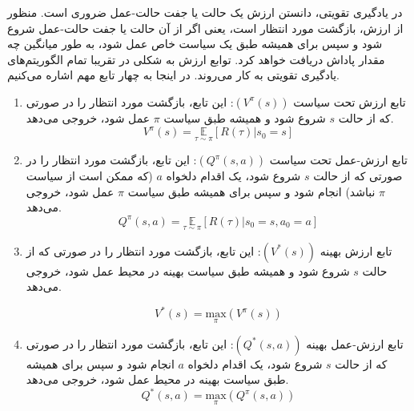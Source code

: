    در یادگیری تقویتی، دانستن ارزش
    یک حالت یا جفت حالت-عمل ضروری است. منظور از ارزش، بازگشت مورد انتظار
     است، یعنی اگر از آن حالت یا جفت حالت-عمل شروع شود و سپس برای همیشه طبق یک سیاست خاص عمل شود، به طور میانگین چه مقدار پاداش دریافت خواهد کرد. توابع ارزش به شکلی در تقریبا تمام الگوریتم‌های یادگیری تقویتی به کار می‌روند.
   در اینجا به چهار تابع مهم اشاره می‌کنیم.
   \begin{enumerate}
   	
   	\item تابع ارزش تحت سیاست 
   	  $(V^{\pi}(s))$:
   	   این تابع، بازگشت مورد انتظار را در صورتی که از حالت $s$ شروع شود و همیشه طبق سیاست $\pi$ عمل شود، خروجی می‌دهد.
   	   \begin{equation}
   	   	V^{\pi}(s) = \underset{\tau \sim \pi}{\mathbb{E}}\left[R(\tau)|s_0 = s\right]
   	   \end{equation}
   	   
   	\item تابع ارزش-عمل تحت سیاست 
   	$(Q^{\pi}(s, a))$:
   	 این تابع، بازگشت مورد انتظار را در صورتی که از حالت $s$ شروع شود، یک اقدام دلخواه $a$ (که ممکن است از سیاست $\pi$ نباشد) انجام شود و سپس برای همیشه طبق سیاست $\pi$ عمل شود، خروجی می‌دهد.
		\begin{equation}
		Q^{\pi}(s, a) = \underset{\tau \sim \pi}{\mathbb{E}}\left[R(\tau)|s_0 = s, a_0 = a\right]
		\end{equation}

 	
   	\item تابع ارزش بهینه
   	  $(V^*(s))$: 
   	 این تابع، بازگشت مورد انتظار را در صورتی که از حالت $s$ شروع شود و همیشه طبق سیاست بهینه در محیط عمل شود، خروجی می‌دهد.

	 \begin{equation}
	 V^*(s) = \underset{\pi}{\mathrm{max}} (V^{\pi}(s))
	 \end{equation}
   	
   	\item تابع ارزش-عمل بهینه
   	  $(Q^*(s, a))$:
   	 این تابع، بازگشت مورد انتظار را در صورتی که از حالت $s$ شروع شود، یک اقدام دلخواه $a$ انجام شود و سپس برای همیشه طبق سیاست بهینه در محیط عمل شود، خروجی می‌دهد.
		\begin{equation}
		Q^*(s, a) = \underset{\pi}{\mathrm{max}} (Q^{\pi}(s, a))
		\end{equation}
   	
   \end{enumerate}
 
   
  
  
  
  
  
  
  
  